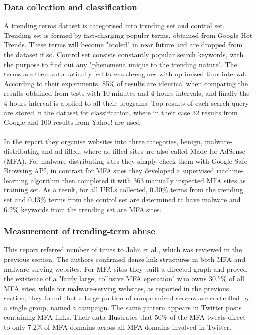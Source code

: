 \subsubsection{Data collection and classification}
A trending terms dataset is categorised into trending set and control set. 
Trending set is formed by fast-changing popular terms, obtained from Google 
Hot Trends. These terms will become "cooled" in near future and are dropped 
from the dataset if so. Control set consists constantly popular search 
keywords, with the purpose to find out any "phenomena unique to the trending 
nature".\cite{fashioncrime} The terms are then automatically fed to search-engines with optimised 
time interval. According to their experiments, 85\% of results are identical 
when comparing the results obtained from tests with 10 minutes and 4 hours 
intervals, and finally the 4 hours interval is applied to all their programs. Top 
results of each search query are stored in the dataset for classification, 
where in their case 32 results from Google and 100 results from Yahoo! are used.
\paragraph{}
In the report they organise websites into three categories, benign, 
malware-distributing and ad-filled, where ad-filled sites are also called Made 
for AdSense (MFA). For malware-distributing sites they simply check them with 
Google Safe Browsing API, in contrast for MFA sites they developed a 
supervised machine-learning algorithm then completed it with 363 manually 
inspected MFA sites as training set. As a result, for all URLs collected, 
0.30\% terms from the trending set and 0.13\% terms from the control set are determined to 
have malware and 6.2\% keywords from the trending set are MFA sites. 
\subsubsection{Measurement of trending-term abuse}
This report referred number of times to John et al.\cite{deseo}, which was 
reviewed in the previous section. The authors confirmed dense link structures in 
both MFA and malware-serving websites. For MFA sites they built a directed 
graph and proved the existence of a "fairly large, collusive MFA operation" 
who owns 30.7\% of all MFA sites, while for malware-serving websites, as 
reported in the previous section, they found that a large portion of 
compromised servers are controlled by a single group, named a campaign. The 
same pattern appears in Twitter posts containing MFA links. Their data 
illustrates that 50\% of the MFA tweets direct to only 7.2\% of MFA domains 
across all MFA domains involved in Twitter. 
